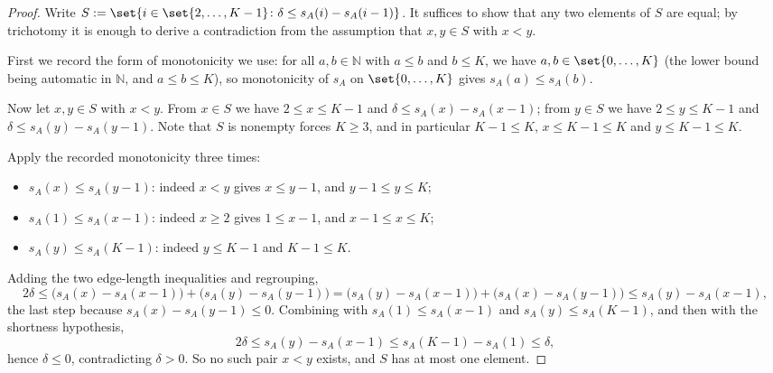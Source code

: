 \begin{proof}
  Write $S := \set{ i \in \set{2,\dots,K-1} \colon \delta \le s_A(i) - s_A(i-1) }$. It suffices to
  show that any two elements of $S$ are equal; by trichotomy it is enough to derive a
  contradiction from the assumption that $x, y \in S$ with $x < y$.

  First we record the form of monotonicity we use: for all $a, b \in \mathbb{N}$ with $a \le b$
  and $b \le K$, we have $a, b \in \set{0,\dots,K}$ (the lower bound being automatic in
  $\mathbb{N}$, and $a \le b \le K$), so monotonicity of $s_A$ on $\set{0,\dots,K}$ gives
  $s_A(a) \le s_A(b)$.

  Now let $x, y \in S$ with $x < y$. From $x \in S$ we have $2 \le x \le K-1$ and
  $\delta \le s_A(x) - s_A(x-1)$; from $y \in S$ we have $2 \le y \le K-1$ and
  $\delta \le s_A(y) - s_A(y-1)$. Note that $S$ is nonempty forces $K \ge 3$, and in particular
  $K - 1 \le K$, $x \le K-1 \le K$ and $y \le K-1 \le K$.

  Apply the recorded monotonicity three times:
  \begin{itemize}
    \item $s_A(x) \le s_A(y-1)$: indeed $x < y$ gives $x \le y-1$, and $y - 1 \le y \le K$;
    \item $s_A(1) \le s_A(x-1)$: indeed $x \ge 2$ gives $1 \le x-1$, and $x - 1 \le x \le K$;
    \item $s_A(y) \le s_A(K-1)$: indeed $y \le K-1$ and $K-1 \le K$.
  \end{itemize}
  Adding the two edge-length inequalities and regrouping,
  \[
    2\delta \le \bigl(s_A(x) - s_A(x-1)\bigr) + \bigl(s_A(y) - s_A(y-1)\bigr)
      = \bigl(s_A(y) - s_A(x-1)\bigr) + \bigl(s_A(x) - s_A(y-1)\bigr)
      \le s_A(y) - s_A(x-1)
    ,
  \]
  the last step because $s_A(x) - s_A(y-1) \le 0$. Combining with $s_A(1) \le s_A(x-1)$ and
  $s_A(y) \le s_A(K-1)$, and then with the shortness hypothesis,
  \[
    2\delta \le s_A(y) - s_A(x-1) \le s_A(K-1) - s_A(1) \le \delta
    ,
  \]
  hence $\delta \le 0$, contradicting $\delta > 0$. So no such pair $x < y$ exists, and $S$ has at
  most one element.
\end{proof}
